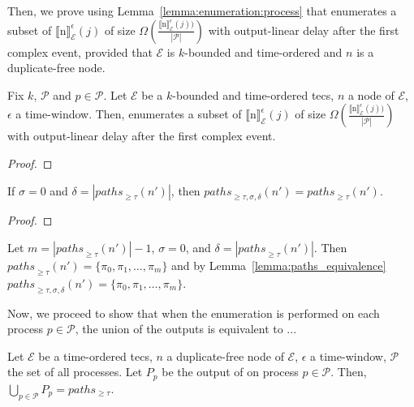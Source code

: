 Then, we prove using Lemma~\ref{lemma:enumeration:process} that  enumerates a subset of ${\llbracket \text{n} \rrbracket}^{\epsilon}_{\mathcal{E}}(j)$ of size $\Omega(\frac{{\llbracket \text{n} \rrbracket}^{\epsilon}_{\mathcal{E}}(j))}{|\mathcal{P}|})$ with output-linear delay after the first complex event, provided that $\mathcal{E}$ is $k$-bounded and time-ordered and $n$ is a duplicate-free node.

\begin{theorem}\label{theorem:enumeration:process}
  Fix $k$, $\mathcal{P}$ and $p \in \mathcal{P}$. Let $\mathcal{E}$ be a $k$-bounded and time-ordered \acrshort{tecs}, $n$ a node of $\mathcal{E}$, $\epsilon$ a time-window. Then,  enumerates a subset of ${\llbracket \text{n} \rrbracket}^{\epsilon}_{\mathcal{E}}(j)$ of size $\Omega(\frac{{\llbracket \text{n} \rrbracket}^{\epsilon}_{\mathcal{E}}(j))}{|\mathcal{P}|})$ with output-linear delay after the first complex event.
\end{theorem}

\begin{proof}

\end{proof}




\begin{lemma}\label{lemma:paths_equivalence}
  If $\sigma = 0$ and $\delta = |{paths}_{\ge \tau}(n')|$, then ${paths}_{\ge \tau, \sigma, \delta}(n') = {paths}_{\ge \tau}(n')$.
\end{lemma}

\begin{proof}

\end{proof}

Let $m = |{paths}_{\ge \tau}(n')| - 1$, $\sigma=0$, and $\delta = |{paths}_{\ge \tau}(n')|$. Then ${paths}_{\ge \tau}(n') = \{\pi_{0}, \pi_{1}, \ldots, \pi_{m}\}$ and by Lemma~\ref{lemma:paths_equivalence} ${paths}_{\ge \tau, \sigma, \delta}(n') = \{\pi_{0}, \pi_{1}, \ldots, \pi_{m}\}$.

Now, we proceed to show that when the enumeration is performed on each process $p \in \mathcal{P}$, the union of the outputs is equivalent to ...

\begin{lemma}
  Let $\mathcal{E}$ be a time-ordered \acrshort{tecs}, $n$ a duplicate-free node of $\mathcal{E}$, $\epsilon$ a time-window, $\mathcal{P}$ the set of all processes. Let $P_{p}$ be the output of  on process $p \in \mathcal{P}$. Then, $\bigcup\limits_{p \in \mathcal{P}} P_{p} = paths_{\ge \tau}$.
\end{lemma}

